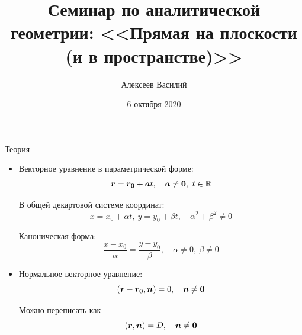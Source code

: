 \documentclass[russian]{beamer}
\title[Прямая ($2$D $+$ $3$D)]
{Семинар по аналитической геометрии: <<Прямая на плоскости (и в пространстве)>>}
\subtitle{}
\author[Василий А.]{
  Алексеев Василий
}
\institute[]
{
  МФТИ
}
\date[2020]
{
  \footnotesize{6 октября 2020}
}
\begin{document}
  \frame{\titlepage}
  
  \begin{frame}{Теория}
  
    \pause
  
    \begin{itemize}
      \item Векторное уравнение в параметрической форме:
        \begin{equation}
          \boldsymbol{r} = \boldsymbol{r_0} + \boldsymbol{a} t, \quad \boldsymbol{a} \not= \boldsymbol{0},\ t \in \operatorname{\mathbb R}
        \end{equation}
      
        \pause
        
        В общей декартовой системе координат:
        \[
          x = x_0 + \alpha t,\ y = y_0 + \beta t,\quad \alpha^2 + \beta^2 \not= 0
        \]
        
        \pause
        
        Каноническая форма:
        \[
          \frac{x - x_0}{\alpha} = \frac{y - y_0}{\beta},\quad \alpha \not= 0,\ \beta \not= 0
        \]
        
        \pause
      
      \item Нормальное векторное уравнение:
        \begin{equation}
          (\boldsymbol{r} - \boldsymbol{r_0}, \boldsymbol{n}) = 0, \quad \boldsymbol{n} \not= \boldsymbol{0}
        \end{equation}
        
        \pause
      
        Можно переписать как
        \[
          (\boldsymbol{r}, \boldsymbol{n}) = D, \quad \boldsymbol{n} \not= \boldsymbol{0}
        \]
    \end{itemize}
  \end{frame}
\end{document}
